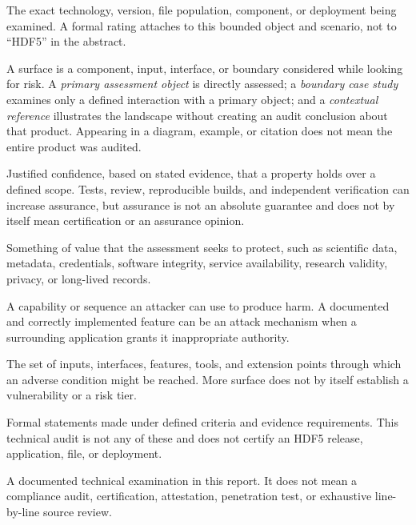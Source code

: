 \documentclass[../main.tex]{subfiles}
\begin{document}
\begin{description}[leftmargin=1.5em,style=nextline]
\item[Assessment object.]
The exact technology, version, file population, component, or deployment being
examined. A formal rating attaches to this bounded object and scenario, not to
``HDF5'' in the abstract.

\item[Assessment surface / scope level.]
A surface is a component, input, interface, or boundary considered while
looking for risk. A \emph{primary assessment object} is directly assessed; a
\emph{boundary case study} examines only a defined interaction with a primary
object; and a \emph{contextual reference} illustrates the landscape without
creating an audit conclusion about that product. Appearing in a diagram,
example, or citation does not mean the entire product was audited.

\item[Assurance.]
Justified confidence, based on stated evidence, that a property holds over a
defined scope. Tests, review, reproducible builds, and independent verification
can increase assurance, but assurance is not an absolute guarantee and does not
by itself mean certification or an assurance opinion.

\item[Asset.]
Something of value that the assessment seeks to protect, such as scientific
data, metadata, credentials, software integrity, service availability,
research validity, privacy, or long-lived records.

\item[Attack mechanism.]
A capability or sequence an attacker can use to produce harm. A documented and
correctly implemented feature can be an attack mechanism when a surrounding
application grants it inappropriate authority.

\item[Attack surface.]
The set of inputs, interfaces, features, tools, and extension points through
which an adverse condition might be reached. More surface does not by itself
establish a vulnerability or a risk tier.

\item[Attestation / certification / assurance opinion.]
Formal statements made under defined criteria and evidence requirements. This
technical audit is not any of these and does not certify an HDF5 release,
application, file, or deployment.

\item[Audit.]
A documented technical examination in this report. It does not mean a
compliance audit, certification, attestation, penetration test, or exhaustive
line-by-line source review.


\end{description}
\end{document}
